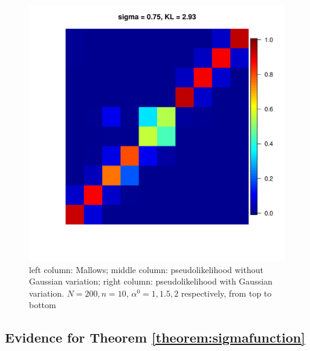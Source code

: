 \documentclass[11pt, oneside]{article}   	%
\begin{document}
\begin{figure}[h!]
{\begin{minipage}[t]{.3\textwidth}
	\end{minipage} 
	\hfill
	\begin{minipage}[t]{.3\textwidth}
		\centering
		\includegraphics[width=\textwidth]{figures/Pseudo_alpha2N100n100run1sd0dot75.pdf}
		
	\end{minipage} 
	
}

	
\caption{left column: Mallows; middle column: pseudolikelihood without Gaussian variation; right column: pseudolikelihood with Gaussian variation. $N = 200, n = 10$, $\alpha^0 = 1, 1.5, 2$ respectively, from top to bottom}
\label{fig:heatPlot_comparison}
\end{figure}
\subsection{Evidence for Theorem \ref{theorem:sigmafunction}}
\end{document}
